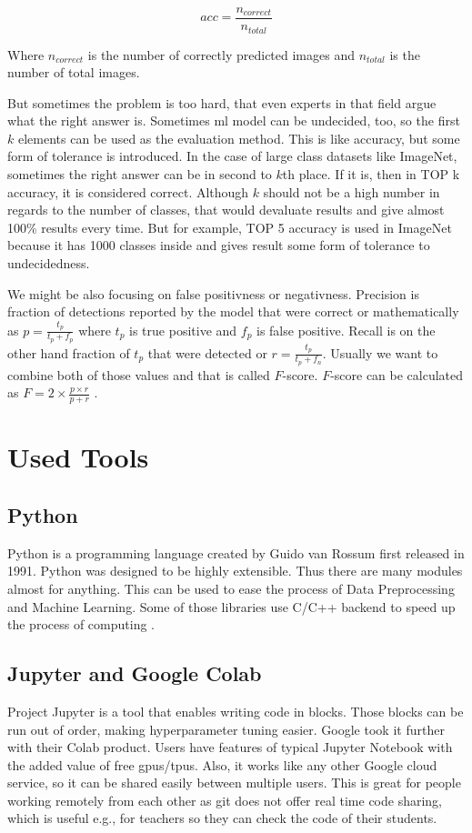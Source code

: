 \documentclass[thesis=B,english]{FITthesis}[2019/12/23]
\begin{document}
$$acc = \frac{n_{correct}}{n_{total}}$$

Where $n_{correct}$ is the number of correctly predicted images and $n_{total}$ is the number of total images.

But sometimes the problem is too hard, that even experts in that field argue what the right answer is. Sometimes \gls{ml} model can be undecided, too, so the first $k$ elements can be used as the evaluation method. This is like accuracy, but some form of tolerance is introduced. In the case of large class datasets like ImageNet, sometimes the right answer can be in second to $k$th place. If it is, then in TOP k accuracy, it is considered correct. Although $k$ should not be a high number in regards to the number of classes, that would devaluate results and give almost 100\% results every time. But for example, TOP 5 accuracy is used in ImageNet \cite{alexnet, vgg, resnet152} because it has 1000 classes inside and gives result some form of tolerance to undecidedness.

We might be also focusing on false positivness or negativness. Precision is fraction of detections reported by the model that were correct or mathematically as $p = \frac{t_p}{t_p + f_p}$ where $t_p$ is true positive and $f_p$ is false positive. Recall is on the other hand fraction of $t_p$ that were detected or $r = \frac{t_p}{t_p + f_n}$. Usually we want to combine both of those values and that is called $F$-score. $F$-score can be calculated as $F = 2\times\frac{p \times r}{p + r}$ \cite{bengio2017deep}.

\chapter{Used Tools}

\section{Python}
Python is a programming language created by Guido van Rossum first released in 1991. Python was designed to be highly extensible. Thus there are many modules almost for anything. This can be used to ease the process of Data Preprocessing and Machine Learning. Some of those libraries use C/C++ backend to speed up the process of computing \cite{numpy_2020, google_brain_2020}.

\section{Jupyter and Google Colab}
Project Jupyter is a tool that enables writing code in blocks. Those blocks can be run out of order, making hyperparameter tuning easier. Google took it further with their Colab product. Users have features of typical Jupyter Notebook with the added value of free \gls{gpu}s/\gls{tpu}s. Also, it works like any other Google cloud service, so it can be shared easily between multiple users. This is great for people working remotely from each other as git does not offer real time code sharing, which is useful e.g., for teachers so they can check the code of their students.
\end{document}
